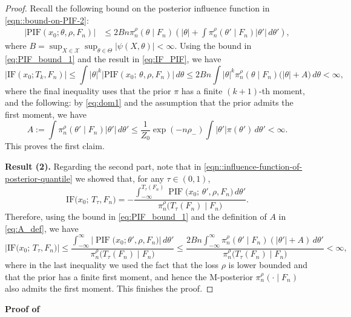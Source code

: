 \documentclass[11pt, oneside]{amsart}
\theoremstyle{definition}   %
\newcommand{\PIF}{\operatorname{PIF}}
\newcommand{\loss}{\rho}
\newcommand{\mposterior}{\pi_n^{\loss}}
\begin{document}
\begin{proof}
    
    Recall the following bound on the posterior influence function in \eqref{eqn::bound-on-PIF-2}:
    \begin{equation}
    \begin{split}
    \label{eq:PIF_bound_1}
        |\textrm{PIF}(x_0; \theta, \rho,F_n)| &\leq 2B n \mposterior(\theta \mid F_n) \left ( | \theta | + \int \mposterior(\theta' \mid F_n) |\theta'| \, d\theta' \right ),
    \end{split}
    \end{equation}
    where \( B = \sup_{X \in \mathcal{X}} \sup_{\theta \in \Theta} \left | \psi(X,\theta) \right | < \infty\). Using the bound in \eqref{eq:PIF_bound_1} and the result in \eqref{eq:IF_PIF}, we have 
    \[
        \bigl | \mathrm{IF}(x_0; T_k,F_n) \bigr | 
        \leq
        \int |\theta| ^k |\textrm{PIF}(x_0; \,\theta,\rho, F_n)| \, d\theta 
        \leq
        2B n \int |\theta|^k \mposterior(\theta \mid F_n)  \bigl (  |\theta| +A \bigr ) \, d\theta 
        <
        \infty,
    \]
    where the final inequality uses that  the prior \( \pi \) has a finite \( (k+1) \)-th moment, and the following: by \eqref{eq:dom1} and the assumption that the prior admits the first moment, we have
    \begin{equation}
    \label{eq:A_def}
        A := \int \mposterior(\theta' \mid F_n) |\theta'| \, d\theta' \leq \frac{1}{Z_0}\exp(-n \rho_-)\int    |\theta'|\pi(\theta') \, d\theta' < \infty.
    \end{equation}
    This proves the first claim.
    
    \textbf{Result (2).} Regarding the second part, note that in \eqref{eqn::influence-function-of-posterior-quantile} we showed that, for any \( \tau \in (0, 1) \),
    \[
    \mathrm{IF}\bigl(x_0;\,T_\tau,F_n\bigr)
        =
        -
        \frac{\displaystyle
          \int_{-\infty}^{T_\tau(F_n)}
            \PIF\bigl(x_0; \,\theta', \rho,F_n\bigr)\,d\theta'
        }{
          \displaystyle \mposterior\bigl(T_\tau(F_n)\mid F_n\bigr)
        }.
    \]
    Therefore, using the bound in \eqref{eq:PIF_bound_1} and the definition of $A$ in \eqref{eq:A_def}, we have
    \[
        \bigl | \mathrm{IF}\bigl(x_0;\,T_\tau,F_n\bigr) \bigr | 
        \leq
        \frac{\displaystyle
          \int_{-\infty}^{\infty}
            \bigl | \PIF\bigl(x_0; \theta',\rho, F_n\bigr) \bigr | \,d\theta'
        }{
          \displaystyle \mposterior\bigl(T_\tau(F_n)\mid F_n\bigr)
        }
        \leq
        \frac{\displaystyle
          2B n \int_{-\infty}^{\infty} \mposterior(\theta' \mid F_n)  (  |\theta'| +A ) \, d\theta'
        }{
          \displaystyle \mposterior\bigl(T_\tau(F_n)\mid F_n\bigr)
        } <\infty,
    \]
    where in the last inequality we used the fact that the loss \(\loss\) is lower bounded and that the prior has a finite first moment, and hence the M-posterior \( \mposterior(\cdot \mid F_n)\) also admits the first moment. This finishes the proof.
\end{proof}
%
%
\noindent \textbf{Proof of }
\end{document}
